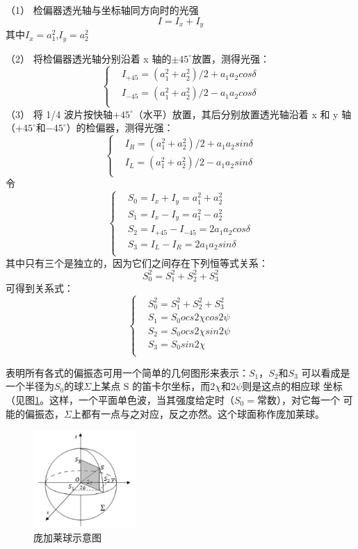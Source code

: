 \documentclass[10pt,a4paper,twoside,UTF8]{ctexart}
\begin{document}
（1） 检偏器透光轴与坐标轴同方向时的光强
\begin{equation}
	I=I_x+I_y
\end{equation}
其中$I_x=a^2_1$,$I_y=a^2_2$

（2） 将检偏器透光轴分别沿着 x 轴的$\pm 45^{\circ}$放置，测得光强：
\[\left\{
\begin{aligned}
&I_{+45}=(a^2_1+a^2_2)/2+a_1 a_2 cos\delta\\
&I_{-45}=(a^2_1+a^2_2)/2-a_1 a_2 cos\delta\\
\end{aligned}
\right.
\]
（3） 将 1/4 波片按快轴$+ 45^{\circ}$（水平）放置，其后分别放置透光轴沿着 x 和 y 轴
（$+ 45^{\circ}$和$- 45^{\circ}$）的检偏器，测得光强：
\[\left\{
\begin{aligned}
&I_{R}=(a^2_1+a^2_2)/2+a_1 a_2 sin\delta\\
&I_{L}=(a^2_1+a^2_2)/2-a_1 a_2 sin\delta\\
\end{aligned}
\right.
\]
令
\[\left\{
\begin{aligned}
&S_0=I_x+I_y=a^2_1+a^2_2\\
&S_1=I_x-I_y=a^2_1-a^2_2\\
&S_2=I_{+45}-I_{-45}=2a_1a_2cos\delta\\
&S_3=I_L-I_R=2a_1a_2sin\delta\\
\end{aligned}
\right.
\]
其中只有三个是独立的，因为它们之间存在下列恒等式关系：
\begin{equation}
	S^2_0=S^2_1+S^2_2+S^2_3
\end{equation}
可得到关系式：
\[\left\{
\begin{aligned}
&S^2_0=S^2_1+S^2_2+S^2_3\\
&S_1=S_0 ocs 2 \chi cos2\psi\\
&S_2=S_0 ocs 2 \chi sin2\psi\\
&S_3=S_0sin2\chi\\
\end{aligned}
\right.
\]

表明所有各式的偏振态可用一个简单的几何图形来表示：$S_1$，$S_2$和$S_3$
可以看成是一个半径为$S_0$的球$\Sigma$上某点 S 的笛卡尔坐标，而$2\chi$和$2\psi$则是这点的相应球
坐标（见图\ref{fig:14}。这样，一个平面单色波，当其强度给定时（$S_0=$常数），对它每一个
可能的偏振态，$\Sigma$上都有一点与之对应，反之亦然。这个球面称作庞加莱球。

\begin{figure}[H]
	\centering
	\includegraphics[width=0.35\textwidth]{img//14.png}
	\caption{庞加莱球示意图}
	\label{fig:14}
\end{figure}
\end{document}
